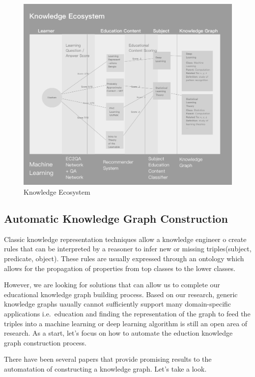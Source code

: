 \documentclass[]{book}
\theoremstyle{definition}
\theoremstyle{definition}
\theoremstyle{definition}
\theoremstyle{remark}
\begin{document}
\begin{figure}
\centering
\includegraphics{img/knowledgeEcosystem.png}
\caption{Knowledge Ecosystem}
\end{figure}

\subsection{Automatic Knowledge Graph
Construction}\label{automatic-knowledge-graph-construction}

Classic knowledge representation techniques allow a knowledge engineer o
create rules that can be interpreted by a reasoner to infer new or
missing triples(subject, predicate, object). These rules are usually
expressed through an ontology which allows for the propagation of
properties from top classes to the lower classes.

However, we are looking for solutions that can allow us to complete our
educational knowledge graph building process. Based on our research,
generic knowledge graphs uaually cannot sufficiently support many
domain-specific applications i.e.~education and finding the
representation of the graph to feed the triples into a machine learning
or deep learning algorithm is still an open area of research. As a
start, let's focus on how to automate the eduction knowledge graph
construction process.

There have been several papers that provide promising results to the
automatation of constructing a knowledge graph. Let's take a look.
\end{document}
